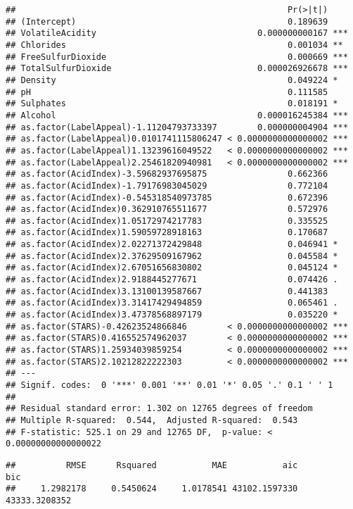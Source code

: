 \documentclass[
]{article}
\begin{document}
\begin{verbatim}
##                                                      Pr(>|t|)    
## (Intercept)                                          0.189639    
## VolatileAcidity                                0.000000000167 ***
## Chlorides                                            0.001034 ** 
## FreeSulfurDioxide                                    0.000669 ***
## TotalSulfurDioxide                             0.000026926678 ***
## Density                                              0.049224 *  
## pH                                                   0.111585    
## Sulphates                                            0.018191 *  
## Alcohol                                        0.000016245384 ***
## as.factor(LabelAppeal)-1.11204793733397        0.000000004904 ***
## as.factor(LabelAppeal)0.0101741115806247 < 0.0000000000000002 ***
## as.factor(LabelAppeal)1.13239616049522   < 0.0000000000000002 ***
## as.factor(LabelAppeal)2.25461820940981   < 0.0000000000000002 ***
## as.factor(AcidIndex)-3.59682937695875                0.662366    
## as.factor(AcidIndex)-1.79176983045029                0.772104    
## as.factor(AcidIndex)-0.545318540973785               0.672396    
## as.factor(AcidIndex)0.362910765511677                0.572976    
## as.factor(AcidIndex)1.05172974217783                 0.335525    
## as.factor(AcidIndex)1.59059728918163                 0.170687    
## as.factor(AcidIndex)2.02271372429848                 0.046941 *  
## as.factor(AcidIndex)2.37629509167962                 0.045584 *  
## as.factor(AcidIndex)2.67051656830802                 0.045124 *  
## as.factor(AcidIndex)2.9188445277671                  0.074426 .  
## as.factor(AcidIndex)3.13100139587667                 0.441383    
## as.factor(AcidIndex)3.31417429494859                 0.065461 .  
## as.factor(AcidIndex)3.47378568897179                 0.035220 *  
## as.factor(STARS)-0.42623524866846        < 0.0000000000000002 ***
## as.factor(STARS)0.416552574962037        < 0.0000000000000002 ***
## as.factor(STARS)1.25934039859254         < 0.0000000000000002 ***
## as.factor(STARS)2.10212822222303         < 0.0000000000000002 ***
## ---
## Signif. codes:  0 '***' 0.001 '**' 0.01 '*' 0.05 '.' 0.1 ' ' 1
## 
## Residual standard error: 1.302 on 12765 degrees of freedom
## Multiple R-squared:  0.544,  Adjusted R-squared:  0.543 
## F-statistic: 525.1 on 29 and 12765 DF,  p-value: < 0.00000000000000022
\end{verbatim}

\begin{verbatim}
##          RMSE      Rsquared           MAE           aic           bic 
##     1.2982178     0.5450624     1.0178541 43102.1597330 43333.3208352
\end{verbatim}
\end{document}
